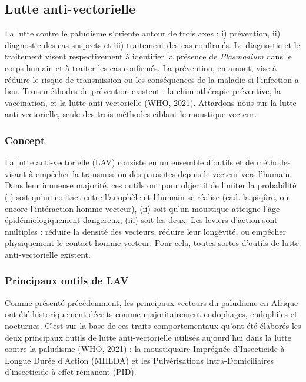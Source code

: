 \documentclass[12pt,twoside]{reedthesis}
\begin{document}
\hypertarget{lutte-anti-vectorielle}{%
\subsection{Lutte anti-vectorielle}\label{lutte-anti-vectorielle}}

La lutte contre le paludisme s'oriente autour de trois axes : i) prévention, ii) diagnostic des cas suspects et iii) traitement des cas confirmés. Le diagnostic et le traitement visent respectivement à identifier la présence de \emph{Plasmodium} dans le corps humain et à traiter les cas confirmés. La prévention, en amont, vise à réduire le risque de transmission ou les conséquences de la maladie si l'infection a lieu. Trois méthodes de prévention existent : la chimiothérapie préventive, la vaccination, et la lutte anti-vectorielle (\protect\hyperlink{ref-who_2021}{WHO, 2021}). Attardons-nous sur la lutte anti-vectorielle, seule des trois méthodes ciblant le moustique vecteur.\\

\hypertarget{concept}{%
\subsubsection{Concept}\label{concept}}

La lutte anti-vectorielle (LAV) consiste en un ensemble d'outils et de méthodes visant à empêcher la transmission des parasites depuis le vecteur vers l'humain. Dans leur immense majorité, ces outils ont pour objectif de limiter la probabilité (i) soit qu'un contact entre l'anophèle et l'humain se réalise (cad. la piqûre, ou encore l'intéraction homme-vecteur), (ii) soit qu'un moustique atteigne l'âge épidémiologiquement dangereux, (iii) soit les deux. Les leviers d'action sont multiples : réduire la densité des vecteurs, réduire leur longévité, ou empêcher physiquement le contact homme-vecteur. Pour cela, toutes sortes d'outils de lutte anti-vectorielle existent.

\hypertarget{lav-principaux-outils}{%
\subsubsection{Principaux outils de LAV}\label{lav-principaux-outils}}

Comme présenté précédemment, les principaux vecteurs du paludisme en Afrique ont été historiquement décrits comme majoritairement endophages, endophiles et nocturnes. C'est sur la base de ces traits comportementaux qu'ont été élaborés les deux principaux outils de lutte anti-vectorielle utilisés aujourd'hui dans la lutte contre la paludisme (\protect\hyperlink{ref-who_2021}{WHO, 2021}) : la moustiquaire Imprégnée d'Insecticide à Longue Durée d'Action (MIILDA) et les Pulvérisations Intra-Domiciliaires d'insecticide à effet rémanent (PID).\\
\end{document}

